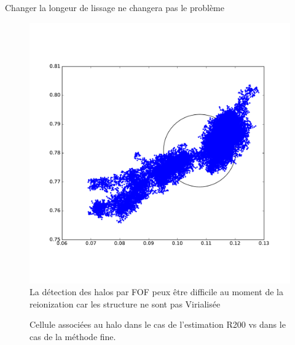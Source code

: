 Changer la longeur de lissage ne changera pas le problème 

\begin{figure}[bth]
        \includegraphics[width=.95\textwidth]{img/03/part_halo_R200.pdf} 
        \caption{La détection des halos par FOF peux être difficile au moment de la reionization car les structure ne sont pas Virialisée
        }
 		\label{fig:part_halo}
\end{figure}

\begin{figure}[bth]
        \caption{Cellule associées au halo dans le cas de l'estimation R200 vs dans le cas de la méthode fine.
        }
 		\label{fig:part_halo}
\end{figure}




